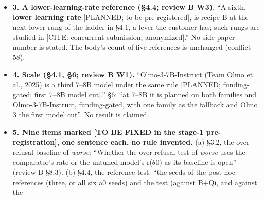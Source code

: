 \documentclass{article}
\theoremstyle{plain}
\theoremstyle{definition}
\theoremstyle{remark}
\begin{document}
\begin{itemize}
        S4 is C only if the customer can sample the untuned model) and a caption
        legend. \S{}4.4 says ``The customer can run the safety prompt and the
        lower learning rate; the provider can run all.'' To stay consistent:
        \S{}1 now says the owner ``often controls only the data and a few
        training settings'' (was ``only the data''), and \S{}6 ``Scope and
        user'' replaces ``can change only the data'' and ``Our answer serves a
        service that must ship the customer's adapter and may change only the
        data, and a pipeline that allows only data changes'' with ``controls the
        data and some hyperparameters'', ``the provider, or a developer with
        open weights, can run every scorer \ldots{}'' and ``We therefore report
        the best repair within each actor's menu (\S{}3.1); a data-only pipeline
        reads the data repairs alone.'' The abstract's conditional ``When only
        the training data may change'' is kept (conflict 60). Not in the body:
        the dataset publisher as an actor and the transfer test (decision 46).
  \item \textbf{3. A lower-learning-rate reference (\S{}4.4; review B W3).} ``A
        sixth, \textbf{lower learning rate} [PLANNED; to be pre-registered], is
        recipe B at the next lower rung of the ladder in \S{}4.1, a lever the
        customer has; such rungs are studied in [CITE: concurrent submission,
        anonymized].'' No side-paper number is stated. The body's count of five
        references is unchanged (conflict 58).
  \item \textbf{4. Scale (\S{}4.1, \S{}6; review B W1).} ``Olmo-3-7B-Instruct
        (Team Olmo et al., 2025) is a third 7--8B model under the same rule
        [PLANNED; funding-gated; first 7--8B model cut].'' \S{}6: ``at 7--8B it
        is planned on both families and Olmo-3-7B-Instruct, funding-gated, with
        one family as the fallback and Olmo 3 the first model cut''. No result
        is claimed.
  \item \textbf{5. Nine items marked [TO BE FIXED in the stage-1
        pre-registration], one sentence each, no rule invented.} (a) \S{}3.2,
        the over-refusal baseline of \emph{worse}: ``Whether the over-refusal
        test of \emph{worse} uses the comparator's rate or the untuned model's
        r($\theta$0) as its baseline is open'' (review B \S{}8.3). (b) \S{}4.4,
        the reference test: ``the seeds of the post-hoc references (three, or
        all six a0 seeds) and the test (against B+Qi, and against the

\end{itemize}
\end{document}
